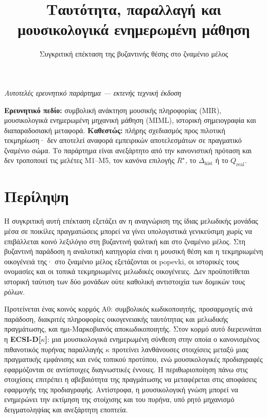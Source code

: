 \documentclass[
  10pt,
  a4paper,
]{report}
\title{Ταυτότητα, παραλλαγή και μουσικολογικά ενημερωμένη μάθηση}
\subtitle{Συγκριτική επέκταση της βυζαντινής θέσης στο ζναμένιο μέλος}
\author{}
\date{}
\begin{document}
\maketitle

{
\hypersetup{linkcolor=}
\setcounter{tocdepth}{2}
\tableofcontents
}
\emph{Αυτοτελές ερευνητικό παράρτημα --- εκτενής τεχνική έκδοση}

\textbf{Ερευνητικό πεδίο:} συμβολική ανάκτηση μουσικής πληροφορίας
(MIR), μουσικολογικά ενημερωμένη μηχανική μάθηση (MIML), ιστορική
σημειογραφία και διαπαραδοσιακή μεταφορά. \textbf{Καθεστώς:} πλήρης
σχεδιασμός προς πιλοτική τεκμηρίωση· δεν αποτελεί αναφορά εμπειρικών
αποτελεσμάτων σε πραγματικό ζναμένιο σώμα. Το παράρτημα είναι ανεξάρτητο
από την κανονιστική πρόταση και δεν τροποποιεί τις μελέτες M1--M5, τον
κανόνα επιλογής \(R^\star\), το \(\Delta_{\mathrm{hist}}\) ή το
\(Q_{\mathrm{real}}\).

\chapter{Περίληψη}\label{ux3c0ux3b5ux3c1ux3afux3bbux3b7ux3c8ux3b7}

Η συγκριτική αυτή επέκταση εξετάζει αν η αναγνώριση της ίδιας μελωδικής
μονάδας μέσα σε ποικίλες πραγματώσεις μπορεί να γίνει υπολογιστικά
γενικεύσιμη χωρίς να επιβάλλεται κοινό λεξιλόγιο στη βυζαντινή ψαλτική
και στο ζναμένιο μέλος. Στη βυζαντινή παράδοση η αναλυτική κατηγορία
είναι η μουσική θέση και η τεκμηριωμένη οικογένειά της· στο ζναμένιο
μέλος εξετάζονται οι popevki, οι ιστορικές τους ονομασίες και οι τοπικά
τεκμηριωμένες μελωδικές οικογένειες. Δεν προϋποτίθεται ιστορική ταύτιση
των δύο μονάδων ούτε καθολική αντιστοιχία των δομικών τους ρόλων.

Προτείνεται ένας κοινός κορμός A0: συμβολικός κωδικοποιητής,
προσαρμογείς ανά παράδοση, διακριτές πληροφορίες οικογενειακής
ταυτότητας και μελωδικής πραγμάτωσης, και ημι-Μαρκοβιανός
αποκωδικοποιητής. Στον κορμό αυτό διερευνάται η
\textbf{ECSI-D{[}\(\kappa\){]}}: μια μουσικολογικά ενημερωμένη σύνθεση
στην οποία ο κανονισμένος πιθανοτικός πυρήνας παραλλαγής \(\kappa\)
προτείνει λανθάνουσες στοιχίσεις μεταξύ μιας πραγματικής εμφάνισης και
ενός τοπικού προτύπου, ενώ μουσικολογικές προδιαγραφές εφαρμόζονται σε
αντίστοιχες διαγνωστικές έννοιες. Η περιθωριοποίηση πάνω στις στοιχίσεις
επιτρέπει η αβεβαιότητα της πραγμάτωσης να μεταφέρεται στις αποφάσεις
εφαρμογής της προδιαγραφής. Αντίστροφα, η μουσικολογική γνώση μπορεί να
ενημερώνει την εκτίμηση της στοίχισης και του πυρήνα, υπό ρητό μηχανισμό
δειγματοληψίας και ανεξάρτητη εποπτεία.
\end{document}
